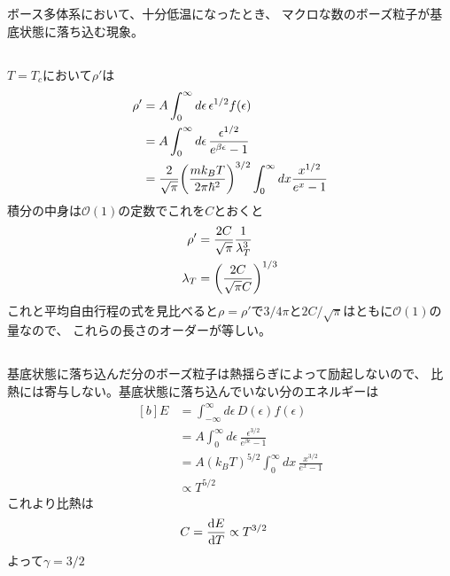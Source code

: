 \documentclass[../../master.tex]{subfiles}
\begin{document}
\subsection{}
ボース多体系において、十分低温になったとき、
マクロな数のボーズ粒子が基底状態に落ち込む現象。

\subsection{}
\(T=T_c\)において\(\rho'\)は
\begin{equation}\begin{aligned}[b]
    \rho' &= A\int_{0}^{\infty}d\epsilon\,\epsilon^{1/2}f(\epsilon)\\
    &= A\int_{0}^{\infty}d\epsilon\,\frac{\epsilon^{1/2}}{e^{\beta \epsilon}-1}\\
    &= \frac{2}{\sqrt{\pi}}\qty(\frac{mk_BT}{2\pi\hbar^2})^{3/2}\int_{0}^{\infty}dx\frac{x^{1/2}}{e^x-1}
\end{aligned}\end{equation}
積分の中身は\(\mathcal{O}(1)\)の定数でこれを\(C\)とおくと
\begin{equation}\begin{aligned}[b]
    \rho' &=\frac{2C}{\sqrt{\pi}}\frac{1}{\lambda_T^3}\\
    \lambda_T &=\qty(\frac{2C}{\sqrt{\pi}C})^{1/3}
\end{aligned}\end{equation}
これと平均自由行程の式を見比べると\(\rho=\rho'\)で\(3/4\pi\)と\(2C/\sqrt{\pi}\)はともに\(\mathcal{O}(1)\)の量なので、
これらの長さのオーダーが等しい。

\subsection{}
基底状態に落ち込んだ分のボーズ粒子は熱揺らぎによって励起しないので、
比熱には寄与しない。基底状態に落ち込んでいない分のエネルギーは
\begin{equation}\begin{aligned}[b]
    E &= \int_{-\infty}^{\infty}d\epsilon\,D(\epsilon)f(\epsilon)\\
    &= A\int_{0}^{\infty} d\epsilon\,\frac{\epsilon^{3/2}}{e^{\beta\epsilon}-1}\\
    &= A(k_BT)^{5/2}\int_{0}^{\infty} dx\,\frac{x^{3/2}}{e^{x}-1}\\
    &\propto T^{5/2}
\end{aligned}\end{equation}
これより比熱は
\begin{equation}\begin{aligned}[b]
    C &= \dv{E}{T}\propto T^{3/2}
\end{aligned}\end{equation}
よって\(\gamma =3/2\)
\end{document}
